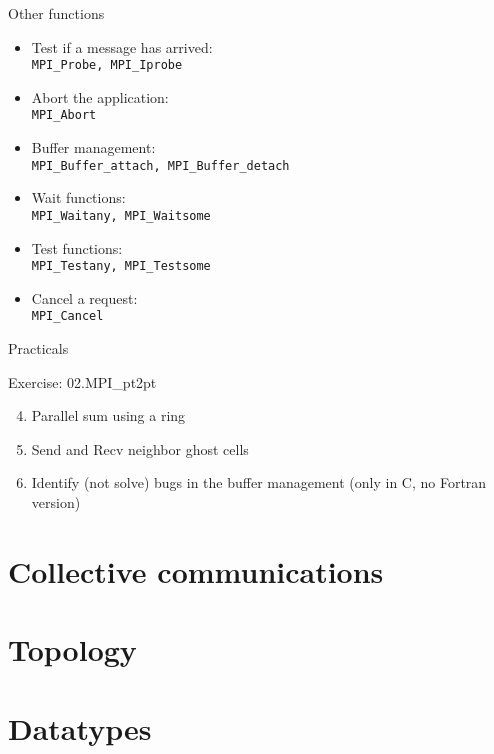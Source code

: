 \documentclass[aspectratio=43]{beamer}
\begin{document}
\begin{frame}[fragile]{Other functions}
\begin{itemize}
    \item Test if a message has arrived:\\\hspace{1cm}\verb+MPI_Probe, MPI_Iprobe+
    \item Abort the application:\\\hspace{1cm}\verb+MPI_Abort+
    \item Buffer management:\\\hspace{1cm}\verb+MPI_Buffer_attach, MPI_Buffer_detach+
    \item Wait functions:\\\hspace{1cm}\verb+MPI_Waitany, MPI_Waitsome+
    \item Test functions:\\\hspace{1cm}\verb+MPI_Testany, MPI_Testsome+
    \item Cancel a request:\\\hspace{1cm}\verb+MPI_Cancel+
\end{itemize}
\end{frame}

\begin{frame}[fragile]{Practicals}
    \begin{brown2block}{Exercise: 02.MPI\_pt2pt}
    \begin{enumerate}
        \setcounter{enumi}{3}
        \item Parallel sum using a ring
        \item Send and Recv neighbor ghost cells
        \item Identify (not solve) bugs in the buffer management (only in C, no Fortran version)
    \end{enumerate}
    \end{brown2block}
\end{frame}

\section{Collective communications}
\section{Topology}
\section{Datatypes}

\end{document}
